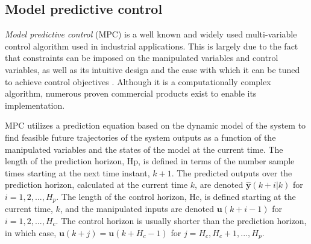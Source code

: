 \subsection{Model predictive control}

\textit{Model predictive control} (\gls{MPC}) is a well known and widely used multi-variable control algorithm used in industrial applications. This is largely due to the fact that constraints can be imposed on the manipulated variables and control variables, as well as its intuitive design and the ease with which it can be tuned to achieve control objectives \citep{maciejowski_predictive_2002}. Although it is a computationally complex algorithm, numerous proven commercial products exist to enable its implementation.

\gls{MPC} utilizes a prediction equation based on the dynamic model of the system to find feasible future trajectories of the system outputs as a function of the manipulated variables and the states of the model at the current time. The length of the prediction horizon, \gls{Hp}, is defined in terms of the number sample times starting at the next time instant, $k+1$. The predicted outputs over the prediction horizon, calculated at the current time $k$, are denoted $\hat{\textbf{y}}(k+i | k)$ for $i=1,2,...,H_p$. The length of the control horizon, \gls{Hc}, is defined starting at the current time, $k$, and the manipulated inputs are denoted $\mathbf{u}(k+i-1)$ for $i=1,2,...,H_c$. The control horizon is usually shorter than the prediction horizon, in which case, $\mathbf{u}(k+j)=\mathbf{u}(k+H_c-1)$ for $j=H_c,H_c+1,...,H_p$.

